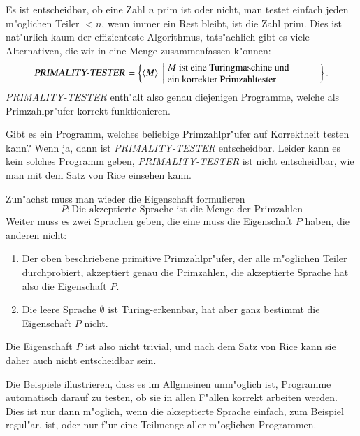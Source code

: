 \begin{beispiel} Es ist entscheidbar, ob eine Zahl $n$
prim ist oder nicht, man testet einfach jeden m"oglichen Teiler $<n$,
wenn immer ein Rest bleibt, ist die Zahl prim.
Dies ist nat"urlich
kaum der effizienteste Algorithmus, tats"achlich gibt es viele Alternativen,
die wir in eine Menge zusammenfassen k"onnen:
\[
\text{\textsl{PRIMALITY-TESTER}}=
\left\{\langle M\rangle\;\left|\;
\begin{minipage}{2.15truein}
\raggedright
$M$ ist eine Turingmaschine und\\
ein korrekter Primzahltester
\end{minipage}
\right.\right\}.
\]
%
\textsl{PRIMALITY-TESTER} enth"alt also genau diejenigen Programme, welche
als Primzahlpr"ufer korrekt funktionieren.

Gibt es ein Programm, welches beliebige Primzahlpr"ufer auf Korrektheit
testen kann? Wenn ja, dann ist \textsl{PRIMALITY-TESTER} entscheidbar.
Leider kann es kein solches Programm geben,
\textsl{PRIMALITY-TESTER} ist nicht entscheidbar, wie man mit dem Satz
von Rice einsehen kann.

Zun"achst muss man wieder die Eigenschaft formulieren
\[
P: \text{Die akzeptierte Sprache ist die Menge der Primzahlen}
\]
Weiter muss es zwei Sprachen geben, die eine muss die Eigenschaft
$P$ haben, die anderen nicht:
\begin{enumerate}
\item
Der oben beschriebene primitive Primzahlpr"ufer, der alle m"oglichen Teiler
durchprobiert, akzeptiert genau die Primzahlen, die akzeptierte Sprache
hat also die Eigenschaft $P$.
\item 
Die leere Sprache $\emptyset$ ist Turing-erkennbar, hat aber ganz bestimmt
die Eigenschaft $P$ nicht.
\end{enumerate}
Die Eigenschaft $P$ ist also nicht trivial, und nach dem Satz von Rice
kann sie daher auch nicht entscheidbar sein.
\end{beispiel}

Die Beispiele illustrieren, dass es im Allgmeinen unm"oglich ist, Programme
automatisch darauf zu testen, ob sie in allen F"allen korrekt arbeiten
werden.
Dies ist nur dann m"oglich, wenn die akzeptierte Sprache einfach,
zum Beispiel regul"ar, ist, oder nur f"ur eine Teilmenge aller m"oglichen
Programmen.

